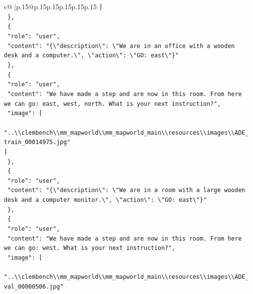 \documentclass{article}
\begin{document}
{\begin{supertabular}{c@{$\;$}|p{.15\linewidth}@{}p{.15\linewidth}p{.15\linewidth}p{.15\linewidth}p{.15\linewidth}p{.15\linewidth}}
{{{\texttt{    {]}} \\
\texttt{  \},} \\
\texttt{  \{} \\
\texttt{    "role": "user",} \\
\texttt{    "content": "\{\textbackslash{}"description\textbackslash{}": \textbackslash{}"We are in an office with a wooden desk and a computer.\textbackslash{}", \textbackslash{}"action\textbackslash{}": \textbackslash{}"GO: east\textbackslash{}"\}"} \\
\texttt{  \},} \\
\texttt{  \{} \\
\texttt{    "role": "user",} \\
\texttt{    "content": "We have made a step and are now in this room. From here we can go: east, west, north. What is your next instruction?",} \\
\texttt{    "image": {[}} \\
\texttt{      "..\textbackslash{}\textbackslash{}clembench\textbackslash{}\textbackslash{}mm\_mapworld\textbackslash{}\textbackslash{}mm\_mapworld\_main\textbackslash{}\textbackslash{}resources\textbackslash{}\textbackslash{}images\textbackslash{}\textbackslash{}ADE\_train\_00014975.jpg"} \\
\texttt{    {]}} \\
\texttt{  \},} \\
\texttt{  \{} \\
\texttt{    "role": "user",} \\
\texttt{    "content": "\{\textbackslash{}"description\textbackslash{}": \textbackslash{}"We are in a room with a large wooden desk and a computer monitor.\textbackslash{}", \textbackslash{}"action\textbackslash{}": \textbackslash{}"GO: east\textbackslash{}"\}"} \\
\texttt{  \},} \\
\texttt{  \{} \\
\texttt{    "role": "user",} \\
\texttt{    "content": "We have made a step and are now in this room. From here we can go: west. What is your next instruction?",} \\
\texttt{    "image": {[}} \\
\texttt{      "..\textbackslash{}\textbackslash{}clembench\textbackslash{}\textbackslash{}mm\_mapworld\textbackslash{}\textbackslash{}mm\_mapworld\_main\textbackslash{}\textbackslash{}resources\textbackslash{}\textbackslash{}images\textbackslash{}\textbackslash{}ADE\_val\_00000506.jpg"} \\
}}}
\end{supertabular}}
\end{document}
